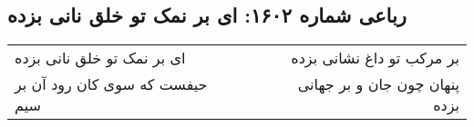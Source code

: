 \begin{center}
\section*{رباعی شماره ۱۶۰۲: ای بر نمک تو خلق نانی بزده}
\label{sec:1602}
\begin{longtable}{l p{0.5cm} r}
ای بر نمک تو خلق نانی بزده
&&
بر مرکب تو داغ نشانی بزده
\\
حیفست که سوی کان رود آن بر سیم
&&
پنهان چون جان و بر جهانی بزده
\\
\end{longtable}
\end{center}
